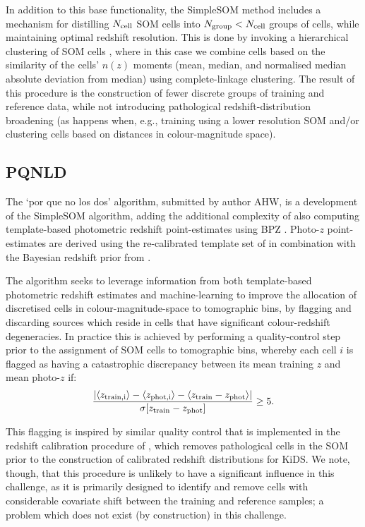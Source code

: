\documentclass[twocolumn,twocolappendix]{aastex63}
\begin{document}
In addition to this base functionality, the SimpleSOM method includes a
mechanism for distilling $N_{\rm cell}$ SOM cells into $N_{\rm group}<N_{\rm
cell}$ groups of cells, while maintaining optimal redshift resolution. This is
done by invoking a hierarchical clustering of SOM cells \citep[see Appendix B of
][]{Wright/etal:2020a}, where in this case we combine cells based on the
similarity of the cells' $n(z)$ moments (mean, median, and normalised median absolute
deviation from median) using complete-linkage clustering. The result of this
procedure is the construction of fewer discrete groups of training and reference
data, while not introducing pathological redshift-distribution broadening (as
happens when, e.g., training using a lower resolution SOM and/or clustering
cells based on distances in colour-magnitude space). 

\subsection{PQNLD} \label{sec:pqnld}

The `por que no los dos' algorithm, submitted by author AHW, is a development of the SimpleSOM algorithm, adding the 
additional complexity of also computing template-based photometric redshift point-estimates using BPZ 
\citep{Benitez:2000}. Photo-$z$ point-estimates are derived using the re-calibrated 
template set of \cite{Capak:2004} in combination with 
the Bayesian redshift prior from \cite{Raichoor/etal:2014}. 

The algorithm seeks to leverage information from both template-based 
photometric redshift estimates and machine-learning to improve the allocation of discretised cells in 
colour-magnitude-space to tomographic bins, by flagging and discarding sources which reside in cells that have 
significant colour-redshift degeneracies. In practice this is achieved by performing a quality-control step prior to 
the assignment of SOM cells to tomographic bins, whereby each cell $i$ is flagged as having a catastrophic 
discrepancy between its mean training $z$ and mean photo-$z$ if: 
\begin{equation}
\frac{|\langle z_{\rm train,i}\rangle - \langle z_{\rm phot,i}\rangle  -\langle z_{\rm train} - z_{\rm phot}\rangle|}
{\sigma[z_{\rm train} - z_{\rm phot}]} \geq 5.
\end{equation}

This flagging is inspired by similar quality control that is implemented in the redshift calibration procedure of
\citet{Wright/etal:2020a}, which removes pathological cells in the SOM prior to the construction of calibrated 
redshift distributions for KiDS. We note, though, that this procedure is unlikely to have a significant influence in this 
challenge, as it is primarily designed to identify and remove cells with considerable covariate shift between the 
training and reference samples; a problem which does not exist (by construction) in this challenge.
\end{document}
